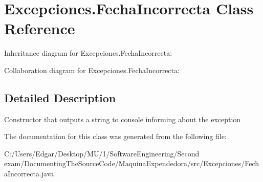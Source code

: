 \hypertarget{class_excepciones_1_1_fecha_incorrecta}{}\section{Excepciones.\+Fecha\+Incorrecta Class Reference}
\label{class_excepciones_1_1_fecha_incorrecta}


Inheritance diagram for Excepciones.\+Fecha\+Incorrecta\+:


Collaboration diagram for Excepciones.\+Fecha\+Incorrecta\+:


\subsection{Detailed Description}
Constructor that outputs a string to console informing about the exception 

The documentation for this class was generated from the following file\+:\begin{DoxyCompactItemize}
\item 
C\+:/\+Users/\+Edgar/\+Desktop/\+M\+U/1/\+Software\+Engineering/\+Second exam/\+Documenting\+The\+Source\+Code/\+Maquina\+Expendedora/src/\+Excepciones/Fecha\+Incorrecta.\+java\end{DoxyCompactItemize}
